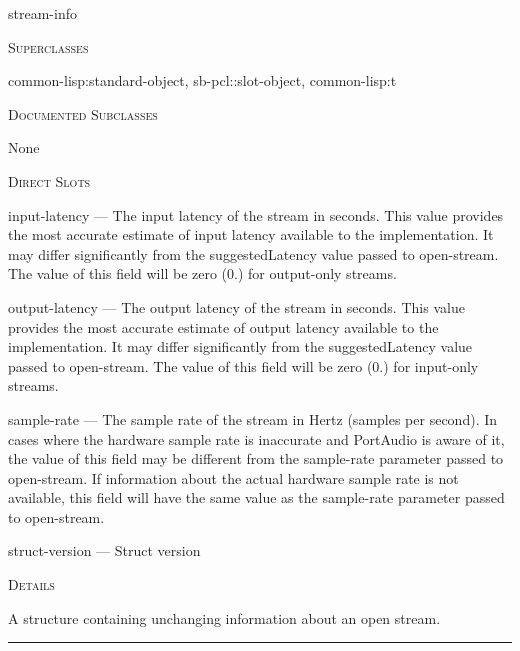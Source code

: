 \documentclass[a4paper]{report}
\begin{document}
    \label{portaudio__class__stream-info}
    \begin{defun}[Class]
    stream-info


      
    \bigskip
    \textsc{Superclasses}

\color[rgb]{0.5,0.5,0.5}common-lisp:standard-object\color[rgb]{0,0,0}, \color[rgb]{0.5,0.5,0.5}sb-pcl::slot-object\color[rgb]{0,0,0}, \color[rgb]{0.5,0.5,0.5}common-lisp:t\color[rgb]{0,0,0}


      
    \bigskip
    \textsc{Documented Subclasses}


	    None
	  


	
    \bigskip
    \textsc{Direct Slots}

input-latency --- The input latency of the stream in seconds. This value provides the most accurate estimate of input latency available to the implementation. It may differ significantly from the suggestedLatency value passed to open-stream. The value of this field will be zero (0.) for output-only streams.

output-latency --- The output latency of the stream in seconds. This value provides the most accurate estimate of output latency available to the implementation. It may differ significantly from the suggestedLatency value passed to open-stream. The value of this field will be zero (0.) for input-only streams.

sample-rate --- The sample rate of the stream in Hertz (samples per second). In cases where the hardware sample rate is inaccurate and PortAudio is aware of it, the value of this field may be different from the sample-rate parameter passed to open-stream. If information about the actual hardware sample rate is not available, this field will have the same value as the sample-rate parameter passed to open-stream.

struct-version --- Struct version




	
    \bigskip
    \textsc{Details}

A structure containing unchanging information about an open stream.


    
    \end{defun}
  
  

    \rule{\linewidth}{0.1mm}
    
\end{document}
